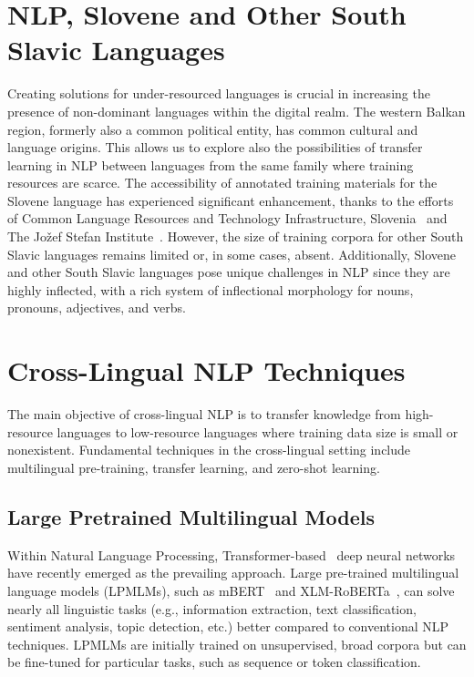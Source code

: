 \section{NLP, Slovene and Other South Slavic Languages}
Creating solutions for under-resourced languages is crucial in increasing the presence of non-dominant languages within the digital realm.
The western Balkan region, formerly also a common political entity, has common cultural and language origins. 
This allows us to explore also the possibilities of transfer learning in NLP between languages from the same family where training resources are scarce. 
The accessibility of annotated training materials for the Slovene language has experienced significant enhancement, thanks to the efforts of Common Language Resources and Technology Infrastructure, Slovenia~\parencite{clarin_si} and The Jožef Stefan Institute~\parencite{nl_ijs_si}. 
However, the size of training corpora for other South Slavic languages remains limited or, in some cases, absent.
Additionally, Slovene and other South Slavic languages pose unique challenges in NLP since they are highly inflected, with a rich system of inflectional morphology for nouns, pronouns, adjectives, and verbs.

\section{Cross-Lingual NLP Techniques}

The main objective of cross-lingual NLP is to transfer knowledge from high-resource languages to low-resource languages where training data size is small or nonexistent.
Fundamental techniques in the cross-lingual setting include multilingual pre-training, transfer learning, and zero-shot learning.

\subsection{Large Pretrained Multilingual Models}

Within Natural Language Processing, Transformer-based~\parencite{vaswani2017attention} deep neural networks have recently emerged as the prevailing approach.
Large pre-trained multilingual language models (LPMLMs), such as mBERT~\parencite{devlin2018bert} and XLM-RoBERTa~\parencite{conneau2019xlmr}, can solve nearly all linguistic tasks (e.g., information extraction, text classification, sentiment analysis, topic detection, etc.) better compared to conventional NLP techniques. 
LPMLMs are initially trained on unsupervised, broad corpora but can be fine-tuned for particular tasks, such as sequence or token classification.

